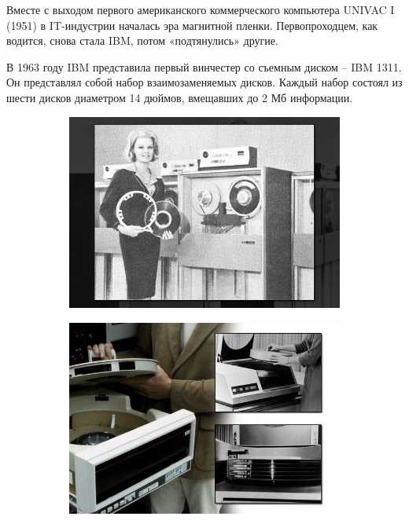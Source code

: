 \documentclass[a4paper, 14pt]{extarticle}
\begin{document}
Вместе с выходом первого американского коммерческого компьютера UNIVAC I (1951) в IT-индустрии началась эра магнитной пленки. Первопроходцем, как водится, снова стала IBM, потом «подтянулись» другие.

В 1963 году IBM представила первый винчестер со съемным диском – IBM 1311. Он представлял собой набор взаимозаменяемых дисков. Каждый набор состоял из шести дисков диаметром 14 дюймов, вмещавших до 2 Мб информации.

\begin{figure}[h]
	\centering
	\begin{subfigure}[b]{0.45\textwidth}
		\centering
		\includegraphics[width=\textwidth]{img/img3.jpg}
	\end{subfigure}
	\begin{subfigure}[b]{0.45\textwidth}
		\centering
		\includegraphics[width=\textwidth]{img/img4.jpg}
	\end{subfigure}
\end{figure}
\end{document}
